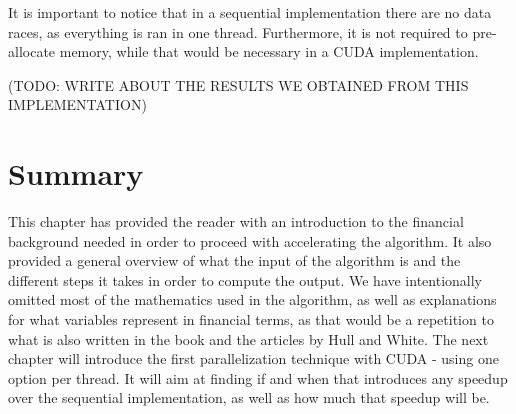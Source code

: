 It is important to notice that in a sequential implementation there are no data races, as everything is ran in one thread. Furthermore, it is not required to pre-allocate memory, while that would be necessary in a CUDA implementation. 

(TODO: WRITE ABOUT THE RESULTS WE OBTAINED FROM THIS IMPLEMENTATION)

\section*{Summary}
This chapter has provided the reader with an introduction to the financial background needed in order to proceed with accelerating the algorithm. It also provided a general overview of what the input of the algorithm is and the different steps it takes in order to compute the output. We have intentionally omitted most of the mathematics used in the algorithm, as well as explanations for what variables represent in financial terms, as that would be a repetition to what is also written in the book and the articles by Hull and White. The next chapter will introduce the first parallelization technique with CUDA - using one option per thread. It will aim at finding if and when that introduces any speedup over the sequential implementation, as well as how much that speedup will be.    